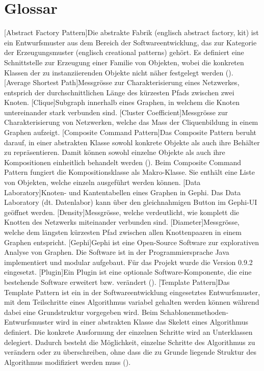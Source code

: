 \chapter*{Glossar}

\begin{acronym}
    [Abstract Factory Pattern]{Die abstrakte Fabrik (englisch abstract factory, kit) ist ein Entwurfsmuster aus dem Bereich der Softwareentwicklung, das zur Kategorie der Erzeugungsmuster (englisch creational patterns) gehört. Es definiert eine Schnittstelle zur Erzeugung einer Familie von Objekten, wobei die konkreten Klassen der zu instanziierenden Objekte nicht näher festgelegt werden (\cite{noauthor_abstrakte_2018}).}
    [Average Shortest Path]{Messgrösse zur Charakterisierung eines Netzwerkes, entsprich der durchschnittlichen Länge des kürzesten Pfads zwischen zwei Knoten.}
    [Clique]{Subgraph innerhalb eines Graphen, in welchem die Knoten untereinander stark verbunden sind.}
    [Cluster Coefficient]{Messgrösse zur Charakterisierung von Netzwerken, welche das Mass der Cliquenbildung in einem Graphen aufzeigt.}
    [Composite Command Pattern]{Das Composite Pattern beruht darauf, in einer abstrakten Klasse sowohl konkrete Objekte als auch ihre Behälter zu repräsentieren. Damit können sowohl einzelne Objekte als auch ihre Kompositionen einheitlich behandelt werden (\cite{noauthor_kompositum_2019}). Beim Composite Command Pattern fungiert die Kompositionsklasse als Makro-Klasse. Sie enthält eine Liste von Objekten, welche einzeln ausgeführt werden können.}
    [Data Laboratory]{Knoten- und Kantentabellen eines Graphen in Gephi. Das Data Laboratory (dt. Datenlabor) kann über den gleichnahmigen Button im Gephi-UI geöffnet werden.}
    [Density]{Messgrösse, welche verdeutlicht, wie komplett die Knotten des Netzwerks miteinander verbunden sind.}
    [Diameter]{Messgrösse, welche dem längsten kürzesten Pfad zwischen allen Knottenpaaren in einem Graphen entspricht.}
    [Gephi]{Gephi ist eine Open-Source Software zur explorativen
    Analyse von Graphen. Die Software ist in der Programmiersprache Java implementiert
    und modular aufgebaut. Für das Projekt wurde die Version 0.9.2 eingesetzt.}
    [Plugin]{Ein Plugin ist eine optionale Software-Komponente, die eine bestehende Software erweitert bzw. verändert (\cite{noauthor_plug-_2019}).}
    [Template Pattern]{Das Template Pattern ist ein in der Softwareentwicklung eingesetztes Entwurfsmuster, mit dem Teilschritte eines Algorithmus variabel gehalten werden können während dabei eine Grundstruktur vorgegeben wird. Beim Schablonenmethoden-Entwurfsmuster wird in einer abstrakten Klasse das Skelett eines Algorithmus definiert. Die konkrete Ausformung der einzelnen Schritte wird an Unterklassen delegiert. Dadurch besteht die Möglichkeit, einzelne Schritte des Algorithmus zu verändern oder zu überschreiben, ohne dass die zu Grunde liegende Struktur des Algorithmus modifiziert werden muss (\cite{noauthor_schablonenmethode_2018}).}
\end{acronym}
